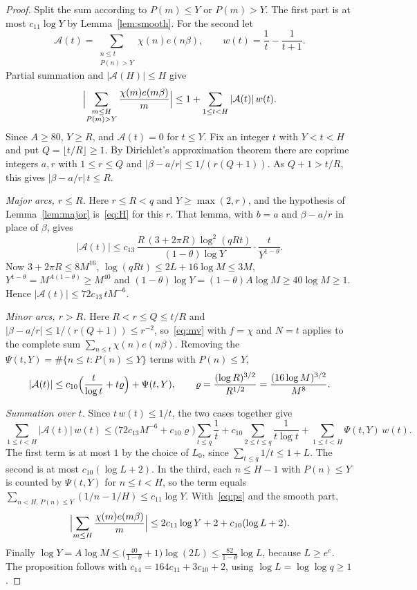 \documentclass[11pt,a4paper,reqno]{amsart}
\theoremstyle{remark}
\numberwithin{equation}{section}
\begin{document}
\begin{proof}
Split the sum according to $P(m)\le Y$ or $P(m)>Y$. The first part is at most $c_{11}\log Y$ by Lemma~\ref{lem:smooth}. For the second let
\[
  \mathcal A(t)=\sum_{\substack{n\le t\\P(n)>Y}}\chi(n)e(n\beta),\qquad w(t)=\frac1t-\frac1{t+1}.
\]
Partial summation and $|\mathcal A(H)|\le H$ give
\begin{equation}\label{eq:ps}
  \Bigl|\sum_{\substack{m\le H\\P(m)>Y}}\frac{\chi(m)e(m\beta)}m\Bigr|\le1+\sum_{1\le t<H}|\mathcal A(t)|\,w(t).
\end{equation}
Since $A\ge80$, $Y\ge R$, and $\mathcal A(t)=0$ for $t\le Y$. Fix an integer $t$ with $Y<t<H$ and put $Q=\lfloor t/R\rfloor\ge1$. By Dirichlet's approximation theorem there are coprime integers $a,r$ with $1\le r\le Q$ and $|\beta-a/r|\le1/(r(Q+1))$. As $Q+1>t/R$, this gives $|\beta-a/r|\,t\le R$.

\emph{Major arcs, $r\le R$.} Here $r\le R<q$ and $Y\ge\max(2,r)$, and the hypothesis of Lemma~\ref{lem:major} is~\eqref{eq:H} for this $r$. That lemma, with $b=a$ and $\beta-a/r$ in place of $\beta$, gives
\[
  |\mathcal A(t)|\le c_{13}\,\frac{R\,(3+2\pi R)\log^2(qRt)}{(1-\theta)\log Y}\cdot\frac t{Y^{1-\theta}} .
\]
Now $3+2\pi R\le8M^{16}$, $\log(qRt)\le2L+16\log M\le3M$, $Y^{1-\theta}=M^{A(1-\theta)}\ge M^{40}$ and $(1-\theta)\log Y=(1-\theta)A\log M\ge40\log M\ge1$. Hence $|\mathcal A(t)|\le72c_{13}\,tM^{-6}$.

\emph{Minor arcs, $r>R$.} Here $R<r\le Q\le t/R$ and $|\beta-a/r|\le1/(r(Q+1))\le r^{-2}$, so~\eqref{eq:mv} with $f=\chi$ and $N=t$ applies to the complete sum $\sum_{n\le t}\chi(n)e(n\beta)$. Removing the $\Psi(t,Y)=\#\{n\le t:P(n)\le Y\}$ terms with $P(n)\le Y$,
\[
  |\mathcal A(t)|\le c_{10}\Bigl(\frac t{\log t}+t\varrho\Bigr)+\Psi(t,Y),\qquad\varrho=\frac{(\log R)^{3/2}}{R^{1/2}}=\frac{(16\log M)^{3/2}}{M^8}.
\]

\emph{Summation over $t$.} Since $t\,w(t)\le1/t$, the two cases together give
\[
  \sum_{1\le t<H}|\mathcal A(t)|\,w(t)\le\bigl(72c_{13}M^{-6}+c_{10}\varrho\bigr)\sum_{t\le q}\frac1t+c_{10}\sum_{2\le t\le q}\frac1{t\log t}+\sum_{1\le t<H}\Psi(t,Y)\,w(t).
\]
The first term is at most $1$ by the choice of $L_0$, since $\sum_{t\le q}1/t\le1+L$. The second is at most $c_{10}(\log L+2)$. In the third, each $n\le H-1$ with $P(n)\le Y$ is counted by $\Psi(t,Y)$ for $n\le t<H$, so the term equals $\sum_{n<H,\,P(n)\le Y}(1/n-1/H)\le c_{11}\log Y$. With~\eqref{eq:ps} and the smooth part,
\[
  \Bigl|\sum_{m\le H}\frac{\chi(m)e(m\beta)}m\Bigr|\le2c_{11}\log Y+2+c_{10}(\log L+2).
\]
Finally $\log Y=A\log M\le\bigl(\frac{40}{1-\theta}+1\bigr)\log(2L)\le\frac{82}{1-\theta}\log L$, because $L\ge e^e$. The proposition follows with $c_{14}=164c_{11}+3c_{10}+2$, using $\log L=\log\log q\ge1$.
\end{proof}
\end{document}
